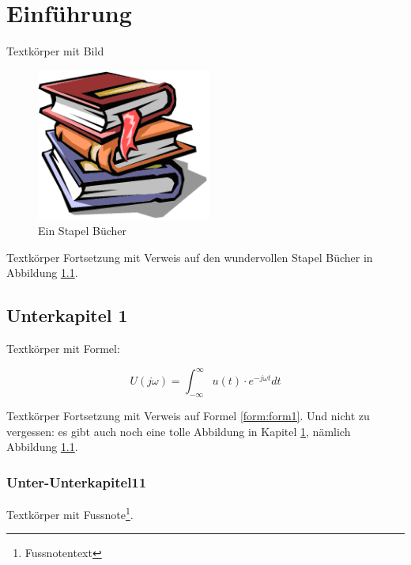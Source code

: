 %
%
% 
% 
% 


\chapter{Einführung}
\label{chap:intro}

Textkörper mit Bild

\begin{figure}[htbp]
	\centering
		\includegraphics[height=5cm]{images/buecher}
	\caption{Ein Stapel Bücher}
	\label{fig:buecher}
\end{figure}


Textkörper Fortsetzung mit Verweis auf den wundervollen Stapel Bücher in Abbildung \ref{fig:buecher}. 


\section{Unterkapitel 1}
\label{sec:Unterkapitel1}

Textkörper mit Formel:

\begin{equation}
U(j\omega)=\int^{\infty}_{-\infty}{u(t) \cdot e^{-j\omega t}dt}
\label{form:form1}
\end{equation}

Textkörper Fortsetzung mit Verweis auf Formel \ref{form:form1}. Und nicht zu vergessen: es gibt auch noch eine tolle Abbildung in Kapitel \ref{chap:intro}, nämlich Abbildung \ref{fig:buecher}. 

\subsection{Unter-Unterkapitel11}
\label{sec:UnterUnterkapitel11}

Textkörper mit Fussnote\footnote{Fussnotentext}.

